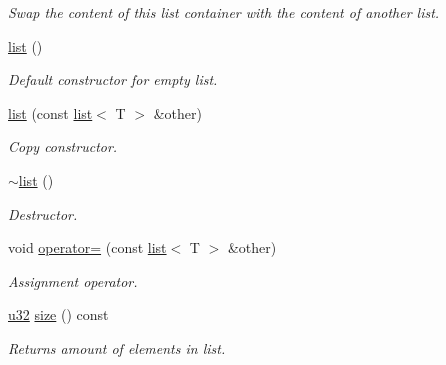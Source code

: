 \begin{DoxyCompactItemize}
\begin{DoxyCompactList}\small\item\em Swap the content of this list container with the content of another list. \end{DoxyCompactList}\item 
\mbox{\label{classirr_1_1core_1_1list_aa4de347b726e57c72270377e1a07d41a}} 
\hyperlink{classirr_1_1core_1_1list_aa4de347b726e57c72270377e1a07d41a}{list} ()
\begin{DoxyCompactList}\small\item\em Default constructor for empty list. \end{DoxyCompactList}\item 
\mbox{\label{classirr_1_1core_1_1list_a28c5e720eb16cee8bf8c26c233de3722}} 
\hyperlink{classirr_1_1core_1_1list_a28c5e720eb16cee8bf8c26c233de3722}{list} (const \hyperlink{classirr_1_1core_1_1list}{list}$<$ T $>$ \&other)
\begin{DoxyCompactList}\small\item\em Copy constructor. \end{DoxyCompactList}\item 
\mbox{\label{classirr_1_1core_1_1list_a5c760fcc63fb6446a33d91e950736a57}} 
\hyperlink{classirr_1_1core_1_1list_a5c760fcc63fb6446a33d91e950736a57}{$\sim$list} ()
\begin{DoxyCompactList}\small\item\em Destructor. \end{DoxyCompactList}\item 
\mbox{\label{classirr_1_1core_1_1list_a43d98ff46af6eb5f4b1f9f71e2f0601c}} 
void \hyperlink{classirr_1_1core_1_1list_a43d98ff46af6eb5f4b1f9f71e2f0601c}{operator=} (const \hyperlink{classirr_1_1core_1_1list}{list}$<$ T $>$ \&other)
\begin{DoxyCompactList}\small\item\em Assignment operator. \end{DoxyCompactList}\item 
\hyperlink{namespaceirr_a0416a53257075833e7002efd0a18e804}{u32} \hyperlink{classirr_1_1core_1_1list_a374ab663f2439599a6b99b47a31e793d}{size} () const
\begin{DoxyCompactList}\small\item\em Returns amount of elements in list. \end{DoxyCompactList}\item 

\end{DoxyCompactItemize}
